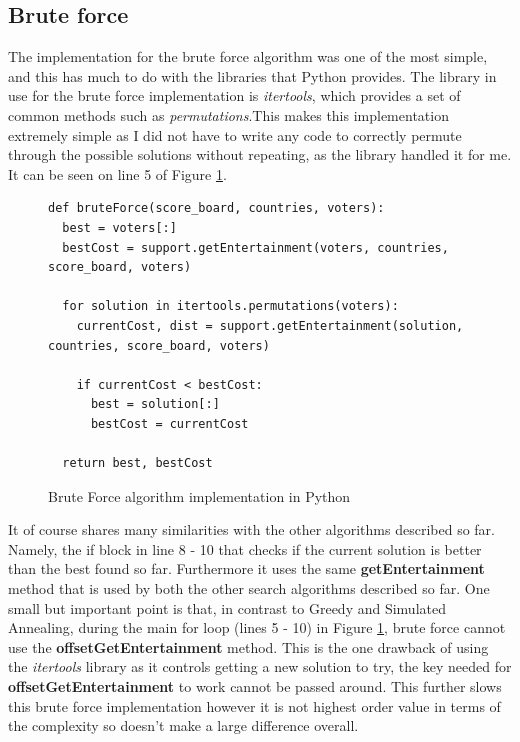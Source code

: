\documentclass[12pt]{report}
\begin{document}
\subsection{Brute force}\label{Imp-Brute}
The implementation for the brute force algorithm was one of the most simple, and this has much to do with the libraries that Python provides. The library in use for the brute force implementation is \textit{itertools}\cite{PythonItertools}, which provides a set of common methods such as \textit{permutations}\cite{PythonPermutations}.This makes this implementation extremely simple as I did not have to write any code to correctly permute through the possible solutions without repeating, as the library handled it for me. It can be seen on line 5 of Figure \ref{bruteForce}.

\begin{figure}[H]
\caption{Brute Force algorithm implementation in Python}
\label{bruteForce}
\begin{lstlisting}
def bruteForce(score_board, countries, voters):
  best = voters[:]
  bestCost = support.getEntertainment(voters, countries, score_board, voters)

  for solution in itertools.permutations(voters):
    currentCost, dist = support.getEntertainment(solution, countries, score_board, voters)

    if currentCost < bestCost:
      best = solution[:]
      bestCost = currentCost

  return best, bestCost
\end{lstlisting}
\end{figure}

It of course shares many similarities with the other algorithms described so far. Namely, the if block in line 8 - 10 that checks if the current solution is better than the best found so far. Furthermore it uses the same \textbf{getEntertainment} method that is used by both the other search algorithms described so far. One small but important point is that, in contrast to Greedy and Simulated Annealing, during the main for loop (lines 5 - 10) in Figure \ref{bruteForce}, brute force cannot use the \textbf{offsetGetEntertainment} method. This is the one drawback of using the \textit{itertools} library as it controls getting a new solution to try, the key needed for \textbf{offsetGetEntertainment} to work cannot be passed around. This further slows this brute force implementation however it is not highest order value in terms of the  complexity so doesn't make a large difference overall.
\end{document}
